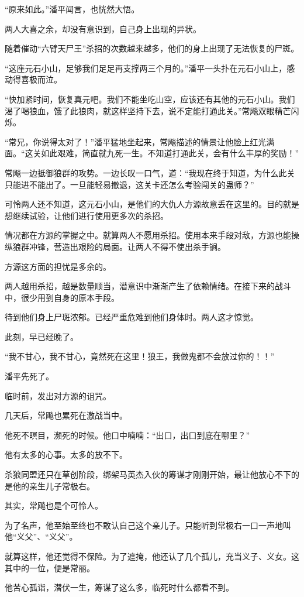 \begin{this_body}
“原来如此。”潘平闻言，也恍然大悟。

两人大喜之余，却没有意识到，自己身上出现的异状。

随着催动“六臂天尸王”杀招的次数越来越多，他们的身上出现了无法恢复的尸斑。

“这座元石小山，足够我们足足再支撑两三个月的。”潘平一头扑在元石小山上，感动得喜极而泣。

“快加紧时间，恢复真元吧。我们不能坐吃山空，应该还有其他的元石小山。我们渴了喝狼血，饿了此狼肉，就这样坚持下去，说不定能打通此关。”常飚双眼精芒闪烁。

“常兄，你说得太对了！”潘平猛地坐起来，常飚描述的情景让他脸上红光满面。“这关如此艰难，简直就九死一生。不知道打通此关，会有什么丰厚的奖励！”

常飚一边抵御狼群的攻势。一边长叹一口气，道：“我现在终于知道，为什么此关只能进不能出了。一旦能轻易撤退，这关卡还怎么考验闯关的蛊师？”

可怜两人还不知道，这元石小山，是他们的大仇人方源故意丢在这里的。目的就是想继续试验，让他们进行使用更多次的杀招。

情况都在方源的掌握之中。就算两人不愿用杀招。使用本来手段对敌，方源也能操纵狼群冲锋，营造出艰险的局面。让两人不得不使出杀手锏。

方源这方面的担忧是多余的。

两人越用杀招，越是数量顺当，潜意识中渐渐产生了依赖情绪。在接下来的战斗中，很少用到自身的原本手段。

待到他们身上尸斑浓郁。已经严重危难到他们身体时。两人这才惊觉。

此刻，早已经晚了。

“我不甘心，我不甘心，竟然死在这里！狼王，我做鬼都不会放过你的！！”

潘平先死了。

临时前，发出对方源的诅咒。

几天后，常飚也累死在激战当中。

他死不瞑目，濒死的时候。他口中喃喃：“出口，出口到底在哪里？”

他有太多的心事。太多的放不下。

杀狼同盟还只在草创阶段，绑架马英杰入伙的筹谋才刚刚开始，最让他放心不下的是他的亲生儿子常极右。

其实，常飚也是个可怜人。

为了名声，他至始至终也不敢认自己这个亲儿子。只能听到常极右一口一声地叫他“义父”、“义父”。

就算这样，他还觉得不保险。为了遮掩，他还认了几个孤儿，充当义子、义女。这其中的一位，便是常丽。

他苦心孤诣，潜伏一生，筹谋了这么多，临死时什么都看不到。


\end{this_body}
